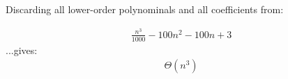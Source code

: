Discarding all lower-order polynominals and all coefficients from:

\begin{eqnarray*}
	\frac{n^3}{1000} - 100 n^2 - 100 n + 3
\end{eqnarray*}
...gives:
\begin{eqnarray*}
	\Theta(n^3)
\end{eqnarray*}

